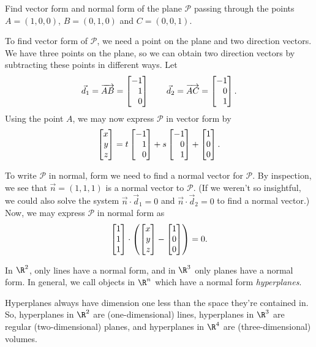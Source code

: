 \begin{example}
	Find vector form and normal form of the plane $\mathcal P$ passing
	through the points $A=(1,0,0)$, $B=(0,1,0)$ and $C=(0,0,1)$.

	To find vector form of $\mathcal P$, we need a point on the plane and
	two direction vectors.  We have three points on the plane, so we can
	obtain two direction vectors by subtracting these points in different ways.
	Let
	\[
		\vec d_1=\overrightarrow{AB} = \mat{-1\\1\\0}\qquad\vec d_2=\overrightarrow{AC}=
		\mat{-1\\0\\1}.
	\]
	Using the point $A$, we may now express $\mathcal P$ in vector form by
	\[
		\mat{x\\y\\z} = t\mat{-1\\1\\0}+s\mat{-1\\0\\1}+\mat{1\\0\\0}.
	\]

	To write $\mathcal P$ in normal, form we need to find a normal vector for $\mathcal P$.  By inspection,
	we see that $\vec n=(1,1,1)$ is a normal vector to $\mathcal P$.  (If we weren't
	so insightful, we could also solve the system $\vec n\cdot \vec d_1=0$ and $\vec n\cdot\vec d_2=0$ to find a
	normal vector.)  Now, we may express $\mathcal P$ in normal form as
	\[
		\mat{1\\1\\1}\cdot\left(\mat{x\\y\\z}-\mat{1\\0\\0}\right)=0.
	\]
\end{example}

In $\R^2$, only lines have a normal form, and in $\R^3$ only planes have a normal form. In general,
we call objects in $\R^n$ which have a normal form \emph{hyperplanes}.


Hyperplanes always have dimension one less than the space they're contained in. So, hyperplanes in
$\R^2$ are (one-dimensional) lines, hyperplanes in $\R^3$ are regular (two-dimensional) planes, 
and hyperplanes in $\R^4$ are (three-dimensional) volumes.


